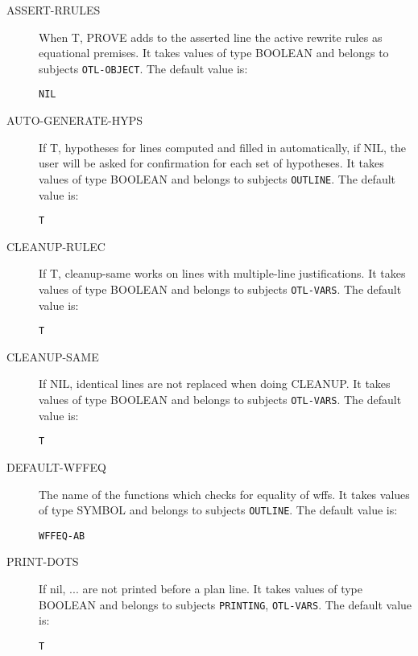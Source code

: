 \begin{description} 
\item[ASSERT-RRULES]  
When T, PROVE adds to the asserted line the active rewrite
rules as equational premises.
It takes values of type BOOLEAN and belongs to subjects \texttt{OTL-OBJECT}.  The default value is: \begin{lstlisting}
NIL
\end{lstlisting}

\item[AUTO-GENERATE-HYPS]  
If T, hypotheses for lines computed and filled in automatically,
if NIL, the user will be asked for confirmation for each set of hypotheses.
It takes values of type BOOLEAN and belongs to subjects \texttt{OUTLINE}.  The default value is: \begin{lstlisting}
T
\end{lstlisting}

\item[CLEANUP-RULEC]  
If T, cleanup-same works on lines with multiple-line justifications.
It takes values of type BOOLEAN and belongs to subjects \texttt{OTL-VARS}.  The default value is: \begin{lstlisting}
T
\end{lstlisting}

\item[CLEANUP-SAME]  
If NIL, identical lines are not replaced when doing CLEANUP.
It takes values of type BOOLEAN and belongs to subjects \texttt{OTL-VARS}.  The default value is: \begin{lstlisting}
T
\end{lstlisting}

\item[DEFAULT-WFFEQ]  
The name of the functions which checks for equality of wffs.
It takes values of type SYMBOL and belongs to subjects \texttt{OUTLINE}.  The default value is: \begin{lstlisting}
WFFEQ-AB
\end{lstlisting}

\item[PRINT-DOTS]  
If nil, ... are not printed before a plan line.
It takes values of type BOOLEAN and belongs to subjects \texttt{PRINTING}, \texttt{OTL-VARS}.  The default value is: \begin{lstlisting}
T
\end{lstlisting}


\end{description}
